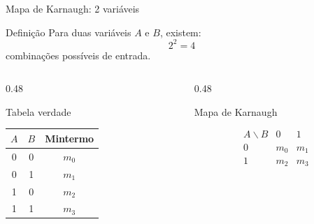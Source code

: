 
\begin{frame}{Mapa de Karnaugh: 2 variáveis}
    \small

    \begin{block}{Definição}
        Para duas variáveis $A$ e $B$, existem:
        \[
            2^2 = 4
        \]
        combinações possíveis de entrada.
    \end{block}

    \begin{columns}[T]

        \begin{column}{0.48\textwidth}
            \begin{block}{Tabela verdade}
                \centering
                \begin{tabular}{c c | c}
                    $A$ & $B$ & Mintermo \\ \hline
                    0 & 0 & $m_0$ \\
                    0 & 1 & $m_1$ \\
                    1 & 0 & $m_2$ \\
                    1 & 1 & $m_3$
                \end{tabular}
            \end{block}
        \end{column}

        \begin{column}{0.48\textwidth}
            \begin{block}{Mapa de Karnaugh}

                \[
                \begin{array}{c|cc}
                    A\backslash B & 0 & 1 \\ \hline
                    0 & m_0 & m_1 \\
                    1 & m_2 & m_3
                \end{array}
                \]

            \end{block}
 
        \end{column}

    \end{columns}

\end{frame}